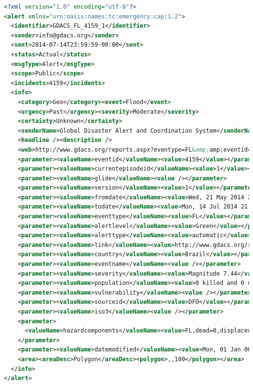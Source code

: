 \documentclass[letterpaper]{article}
\begin{document}
\begin{lstlisting}[caption={\emph{Common Alerting Protocol} feed
  via the \emph{Global Disaster Alert and Coordination System}
  (\url{http://www.gdacs.org/xml/gdacs_cap.xml}, 2014-07-16)},
  label=listing:cap, language=xml,morekeywords={xmlns,encoding,alert,
  identifier,sender,sent,status,msgType,scope,incidents,info,
  category,event,urgency,severity,certainty, senderName,headline,
  description,web,parameter,value,valueName,area,areaDesc,polygon},
  float=*, stringstyle=\color{gray}, ]
<?xml version="1.0" encoding="utf-8"?>
<alert xmlns="urn:oasis:names:tc:emergency:cap:1.2">
  <identifier>GDACS_FL_4159_1</identifier>
  <sender>info@gdacs.org</sender>
  <sent>2014-07-14T23:59:59-00:00</sent>
  <status>Actual</status>
  <msgType>Alert</msgType>
  <scope>Public</scope>
  <incidents>4159</incidents>
  <info>
    <category>Geo</category><event>Flood</event>
    <urgency>Past</urgency><severity>Moderate</severity>
    <certainty>Unknown</certainty>
    <senderName>Global Disaster Alert and Coordination System</senderName>
    <headline /><description />
    <web>http://www.gdacs.org/reports.aspx?eventype=FL&amp;amp;eventid=4159</web>
    <parameter><valueName>eventid</valueName><value>4159</value></parameter>
    <parameter><valueName>currentepisodeid</valueName><value>1</value></parameter>
    <parameter><valueName>glide</valueName><value /></parameter>
    <parameter><valueName>version</valueName><value>1</value></parameter>
    <parameter><valueName>fromdate</valueName><value>Wed, 21 May 2014 22:00:00 GMT</value></parameter>
    <parameter><valueName>todate</valueName><value>Mon, 14 Jul 2014 21:59:59 GMT</value></parameter>
    <parameter><valueName>eventtype</valueName><value>FL</value></parameter>
    <parameter><valueName>alertlevel</valueName><value>Green</value></parameter>
    <parameter><valueName>alerttype</valueName><value>automatic</value></parameter>
    <parameter><valueName>link</valueName><value>http://www.gdacs.org/report.aspx?eventtype=FL&amp;amp;eventid=4159</value></parameter>
    <parameter><valueName>country</valueName><value>Brazil</value></parameter>
    <parameter><valueName>eventname</valueName><value /></parameter>
    <parameter><valueName>severity</valueName><value>Magnitude 7.44</value></parameter>
    <parameter><valueName>population</valueName><value>0 killed and 0 displaced</value></parameter>
    <parameter><valueName>vulnerability</valueName><value /></parameter>
    <parameter><valueName>sourceid</valueName><value>DFO</value></parameter>
    <parameter><valueName>iso3</valueName><value /></parameter>
    <parameter>
      <valueName>hazardcomponents</valueName><value>FL,dead=0,displaced=0,main_cause=Heavy Rain,severity=2,sqkm=256564.57</value>
    </parameter>
    <parameter><valueName>datemodified</valueName><value>Mon, 01 Jan 0001 00:00:00 GMT</value></parameter>
    <area><areaDesc>Polygon</areaDesc><polygon>,,100</polygon></area>
  </info>
</alert>
\end{lstlisting}
\end{document}
